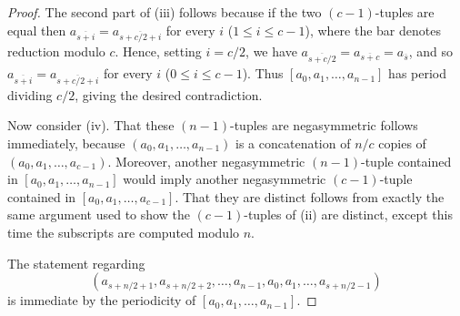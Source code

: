 \documentclass[10pt,a4paper]{amsart}
\begin{document}
\begin{proof}
The second part of (iii) follows because if the two $(c-1)$-tuples are equal then
$a_{\overline{s+i}}=a_{\overline{s+c/2+i}}$ for every $i$ ($1\leq i\leq c-1$), where the bar
denotes reduction modulo $c$. Hence, setting $i=c/2$, we have
$a_{\overline{s+c/2}}=a_{\overline{s+c}}=a_{\overline{s}}$, and so
$a_{\overline{s+i}}=a_{\overline{s+c/2+i}}$ for every $i$ ($0\leq i\leq c-1$). Thus
$[a_0,a_1,\dots,a_{n-1}]$ has period dividing $c/2$, giving the desired contradiction.



Now consider (iv). That these $(n-1)$-tuples are negasymmetric follows immediately, because
$(a_0,a_1,\dots,a_{n-1})$ is a concatenation of $n/c$ copies of $(a_0,a_1,\dots,a_{c-1})$.
Moreover, another negasymmetric $(n-1)$-tuple contained in $[a_0,a_1,\dots,a_{n-1}]$ would imply
another negasymmetric $(c-1)$-tuple contained in $[a_0,a_1,\dots,a_{c-1}]$. That they
are distinct follows from exactly the same argument used to show the $(c-1)$-tuples of (ii) are
distinct, except this time the subscripts are computed modulo $n$.

The statement regarding
\[ (a_{s+n/2+1},a_{s+n/2+2},\dots,a_{n-1},a_0,a_1,\dots,a_{s+n/2-1}) \]
is immediate by the periodicity of $[a_0,a_1,\dots,a_{n-1}]$.
\end{proof}
\end{document}
